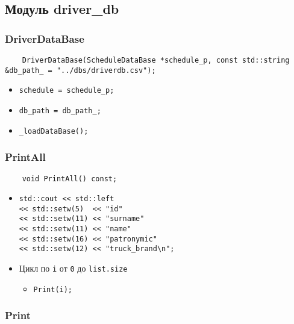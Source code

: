 \subsection{Модуль driver\_db}

\subsubsection{DriverDataBase}

\begin{lstlisting}
    DriverDataBase(ScheduleDataBase *schedule_p, const std::string &db_path_ = "../dbs/driverdb.csv");
\end{lstlisting}

\begin{itemize}
    \item \verb|schedule = schedule_p;|
    \item \verb|db_path = db_path_;|
    \item \verb|_loadDataBase();|
\end{itemize}

\subsubsection{PrintAll}

\begin{lstlisting}
    void PrintAll() const;
\end{lstlisting}

\begin{itemize}
    \item \verb|std::cout << std::left|\\
    \verb|<< std::setw(5)  << "id"|\\
    \verb|<< std::setw(11) << "surname"|\\
    \verb|<< std::setw(11) << "name"|\\
    \verb|<< std::setw(16) << "patronymic"|\\
    \verb|<< std::setw(12) << "truck_brand\n";|
    \item Цикл по \verb|i| от \verb|0| до \verb|list.size| 
        \begin{itemize}
            \item \verb|Print(i);|
        \end{itemize}
\end{itemize}

\subsubsection{Print}

